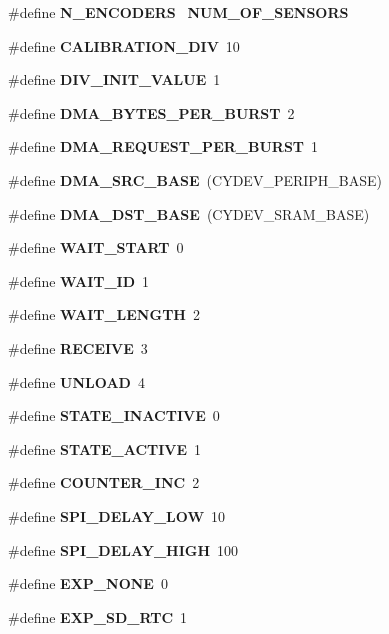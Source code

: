 \begin{DoxyCompactItemize}
\#define {\bfseries N\+\_\+\+E\+N\+C\+O\+D\+E\+RS}~\textbf{ N\+U\+M\+\_\+\+O\+F\+\_\+\+S\+E\+N\+S\+O\+RS}
\item 
\#define \textbf{ C\+A\+L\+I\+B\+R\+A\+T\+I\+O\+N\+\_\+\+D\+IV}~10
\item 
\#define \textbf{ D\+I\+V\+\_\+\+I\+N\+I\+T\+\_\+\+V\+A\+L\+UE}~1
\item 
\mbox{\label{globals_8h_abf6c9afec04b86961e177e0646401ace}} 
\#define {\bfseries D\+M\+A\+\_\+\+B\+Y\+T\+E\+S\+\_\+\+P\+E\+R\+\_\+\+B\+U\+R\+ST}~2
\item 
\mbox{\label{globals_8h_ab4613f8bee68bc68fa6fe94a3ae6d568}} 
\#define {\bfseries D\+M\+A\+\_\+\+R\+E\+Q\+U\+E\+S\+T\+\_\+\+P\+E\+R\+\_\+\+B\+U\+R\+ST}~1
\item 
\mbox{\label{globals_8h_a3cc2eedb40809a1f15ad841c8abbcebf}} 
\#define {\bfseries D\+M\+A\+\_\+\+S\+R\+C\+\_\+\+B\+A\+SE}~(C\+Y\+D\+E\+V\+\_\+\+P\+E\+R\+I\+P\+H\+\_\+\+B\+A\+SE)
\item 
\mbox{\label{globals_8h_aa54e301f446a66cbf8c943d920c8e967}} 
\#define {\bfseries D\+M\+A\+\_\+\+D\+S\+T\+\_\+\+B\+A\+SE}~(C\+Y\+D\+E\+V\+\_\+\+S\+R\+A\+M\+\_\+\+B\+A\+SE)
\item 
\#define \textbf{ W\+A\+I\+T\+\_\+\+S\+T\+A\+RT}~0
\item 
\#define \textbf{ W\+A\+I\+T\+\_\+\+ID}~1
\item 
\#define \textbf{ W\+A\+I\+T\+\_\+\+L\+E\+N\+G\+TH}~2
\item 
\#define \textbf{ R\+E\+C\+E\+I\+VE}~3
\item 
\#define \textbf{ U\+N\+L\+O\+AD}~4
\item 
\#define \textbf{ S\+T\+A\+T\+E\+\_\+\+I\+N\+A\+C\+T\+I\+VE}~0
\item 
\#define \textbf{ S\+T\+A\+T\+E\+\_\+\+A\+C\+T\+I\+VE}~1
\item 
\#define \textbf{ C\+O\+U\+N\+T\+E\+R\+\_\+\+I\+NC}~2
\item 
\mbox{\label{globals_8h_a42c6406a75a89d50c9f1b9c86388565c}} 
\#define {\bfseries S\+P\+I\+\_\+\+D\+E\+L\+A\+Y\+\_\+\+L\+OW}~10
\item 
\mbox{\label{globals_8h_a054002df34537a2a4ff6f520b65f1ba4}} 
\#define {\bfseries S\+P\+I\+\_\+\+D\+E\+L\+A\+Y\+\_\+\+H\+I\+GH}~100
\item 
\mbox{\label{globals_8h_a963cfc2155941aff08c02b451042c295}} 
\#define {\bfseries E\+X\+P\+\_\+\+N\+O\+NE}~0
\item 
\mbox{\label{globals_8h_a6a936c7ef5908ffabf8be42833a3daee}} 
\#define {\bfseries E\+X\+P\+\_\+\+S\+D\+\_\+\+R\+TC}~1

\end{DoxyCompactItemize}
